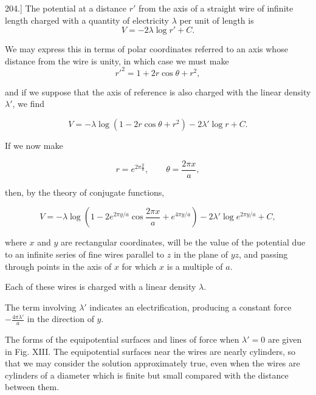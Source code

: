 \documentclass[11pt,a4paper]{article}
\begin{document}
204.] The potential at a distance $r'$ from the axis of a straight wire
of infinite length charged with a quantity of electricity $\lambda$ per
unit of length is
\begin{equation}\tag{1}
V=-2\lambda\log r'+C.
\end{equation}

We may express this in terms of polar coordinates referred to an axis
whose distance from the wire is unity, in which case we must make
\begin{equation}\tag{2}
r'^2=1+2r\cos\theta+r^2,
\end{equation}

and if we suppose that the axis of reference is also charged with the
linear density $\lambda'$, we find

\begin{equation}\tag{3}
V=-\lambda\log\left(1-2r\cos\theta+r^2\right)-2\lambda'\log r+C.
\end{equation}

If we now make

\begin{equation}\tag{4}
r = e^{2\pi\frac{y}{a}}, \qquad \theta = \frac{2\pi x}{a},
\end{equation}

\setcounter{footnote}{0}
then, by the theory of conjugate functions,

\begin{equation}\tag{5}
V=-\lambda\log\left(1-2e^{2\pi y/a}\cos\frac{2\pi x}{a}
+e^{4\pi y/a}\right)-2\lambda'\log e^{2\pi y/a}+C,
\end{equation}

where $x$ and $y$ are rectangular coordinates, will be the value of the
potential due to an infinite series of fine wires parallel to $z$ in
the plane of $yz$, and passing through points in the axis of $x$ for
which $x$ is a multiple of $a$.

Each of these wires is charged with a linear density $\lambda$.

The term involving $\lambda'$ indicates an electrification, producing a
constant force $-\frac{4\pi\lambda'}{a}$ in the direction of $y$.

The forms of the equipotential surfaces and lines of force when
$\lambda'=0$ are given in Fig. XIII. The equipotential surfaces near
the wires are nearly cylinders, so that we may consider the solution
approximately true, even when the wires are cylinders of a diameter
which is finite but small compared with the distance between them.
\end{document}
